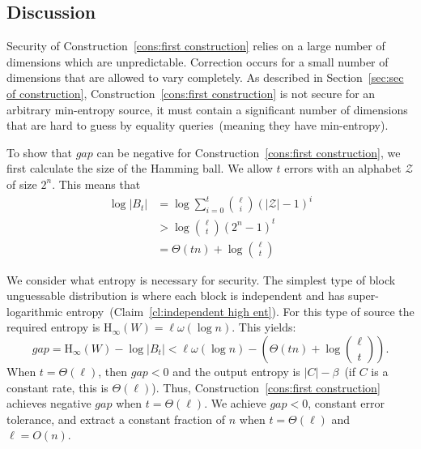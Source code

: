 \documentclass[11pt]{article}
\newcommand{\secref}[1]{\mbox{Section~\ref{#1}}}
\newcommand{\lemref}[1]{\mbox{Lemma~\ref{#1}}}
\newcommand{\clref}[1]{\mbox{Claim~\ref{#1}}}
\newcommand{\consref}[1]{\mbox{Construction~\ref{#1}}}
\newcommand{\Hoo}{\mathrm{H}_\infty}
\newcommand{\authnote}[2]{{\textcolor{red}{\textsf{#1 notes: }\textcolor{blue}{ #2}}\marginpar{\textcolor{red}{\textbf{!!!!!}}}}}
\newcommand{\authnote}[2]{}
\newcommand{\bnote}[1]{{\authnote{Ben}{#1}}}
\begin{document}
%
%


\subsection{Discussion}
\label{sec:discussion}
Security of \consref{cons:first construction} relies on a large number of dimensions which are unpredictable.  Correction occurs for a small number of dimensions that are allowed to vary completely.  As described in \secref{sec:sec of construction}, \consref{cons:first construction} is not secure for an arbitrary min-entropy source, it must contain a significant number of dimensions that are hard to guess by equality queries~(meaning they have min-entropy).

To show that $gap$ can be negative for \consref{cons:first construction}, we first calculate the size of the Hamming ball.  We allow $t$ errors with an alphabet $\mathcal{Z}$ of size $2^n$.  This means that
\begin{align*}
\log |B_t| &= \log \sum_{i=0}^t {\ell \choose i} (|\mathcal{Z}|-1)^i\\
&> \log {\ell \choose t} (2^n-1)^t\\
&=\Theta(tn) + \log {\ell\choose t}
\end{align*}

We consider what entropy is necessary for security.  The simplest type of block unguessable distribution is where each block is independent and has super-logarithmic entropy~(\clref{cl:independent high ent}).  For this type of source the required entropy is $\Hoo(W) = \ell\omega(\log n)$.  This yields:
\[
gap = \Hoo(W) - \log |B_t| < \ell \omega(\log n) -\left( \Theta(t n) + \log {\ell \choose t}\right).
\]
When $t =\Theta(\ell)$, then $gap<0$ and the output entropy is $|C| -\beta$~(if $C$ is a constant rate, this is $\Theta(\ell)$).
Thus, \consref{cons:first construction} achieves negative $gap$ when $t = \Theta(\ell)$.  We achieve $gap<0$, constant error tolerance, and extract a constant fraction of $n$ when $t = \Theta(\ell)$ and $\ell = O(n)$.
\end{document}

